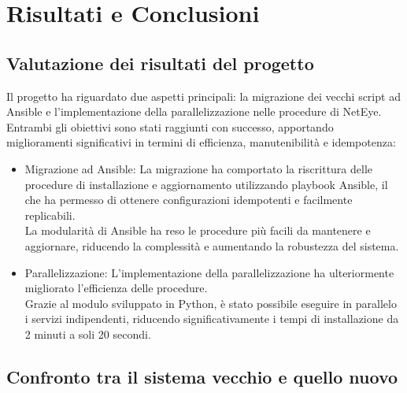 \chapter{Risultati e Conclusioni}
\label{cha:conclusioni}

\section{Valutazione dei risultati del progetto}
\label{sec:valutazione}

Il progetto ha riguardato due aspetti principali: la migrazione dei vecchi
script ad Ansible e l'implementazione della parallelizzazione nelle procedure di
NetEye.\\ Entrambi gli obiettivi sono stati raggiunti con successo, apportando miglioramenti
significativi in termini di efficienza, manutenibilità e idempotenza:
\begin{itemize}
  \item Migrazione ad Ansible: La migrazione ha comportato la riscrittura delle
    procedure di installazione e aggiornamento utilizzando playbook Ansible, il che
    ha permesso di ottenere configurazioni idempotenti e facilmente replicabili.\\
    La modularità di Ansible ha reso le procedure più facili da mantenere e aggiornare,
    riducendo la complessità e aumentando la robustezza del sistema.

  \item Parallelizzazione: L'implementazione della parallelizzazione ha
    ulteriormente migliorato l'efficienza delle procedure.\\ Grazie al modulo
    sviluppato in Python, è stato possibile eseguire in parallelo i servizi indipendenti,
    riducendo significativamente i tempi di installazione da 2 minuti a soli 20
    secondi.
\end{itemize}

\section{Confronto tra il sistema vecchio e quello nuovo}
\label{sec:confronto}

